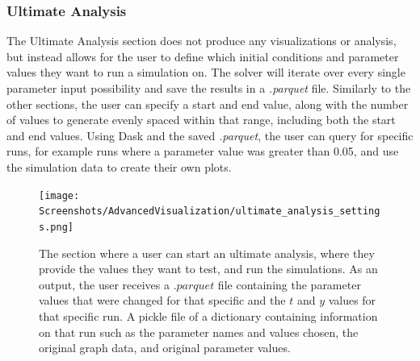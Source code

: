 \subsubsection{Ultimate Analysis}
The Ultimate Analysis section does not produce any visualizations or analysis, but instead allows for the user to define which initial conditions and parameter values they want to run a simulation on. 
The solver will iterate over every single parameter input possibility and save the results in a \textit{.parquet} file. 
Similarly to the other sections, the user can specify a start and end value, along with the number of values to generate evenly spaced within that range, including both the start and end values. 
\newline 
Using Dask and the saved \textit{.parquet}, the user can query for specific runs, for example runs where a parameter value was greater than 0.05, and use the simulation data to create their own plots. 
\begin{figure}
    \centering
    \texttt{[image: Screenshots/AdvancedVisualization/ultimate\_analysis\_settings.png]}
    \caption{
        The section where a user can start an ultimate analysis, where they provide the values they want to test, and run the simulations. 
        As an output, the user receives a $.parquet$ file containing the parameter values that were changed for that specific and the $t$ and $y$ values for that specific run. 
        A pickle file of a dictionary containing information on that run such as the parameter names and values chosen, the original graph data, and original parameter values. 
    }
    \label{fig:ss:av:ultimate_analysis_settings}
\end{figure}
